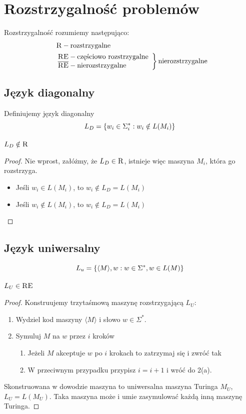 \section{Rozstrzygalność problemów}
Rozstrzygalność rozumiemy następująco:
\begin{align*}
& \ \: \textsc{R} - \text{rozstrzygalne} \\
& \left.
\begin{array}{l}
\textsc{RE} - \text{częściowo rozstrzygalne} \\
\overline{\textsc{RE}} - \text{nierozstrzygalne}
\end{array}
\right\} \text{nierozstrzygalne}
\end{align*}

\subsection{Język diagonalny}
Definiujemy język diagonalny
\[ L_D = \set{w_i \in \Sigma_i^*: w_i \notin L(M_i)} \]
\begin{theorem}
    \( L_D \notin \textsc{R} \)
\end{theorem}
\begin{proof}
    Nie wprost, załóżmy, że \( L_D \in \textsc{R} \), istnieje więc maszyna \(M_i\), która go rozstrzyga.
    \begin{itemize}
        \item Jeśli \( w_i \in L(M_i) \), to \( w_i \notin L_D = L(M_i) \)
        \item Jeśli \( w_i \notin L(M_i) \), to \( w_i \notin L_D = L(M_i) \)
    \end{itemize}
\end{proof}

\subsection{Język uniwersalny}
\[ L_u = \set{\langle M \rangle, w: w \in \Sigma^*, w \in L(M)} \]
\begin{theorem}
    \(L_U \in \textsc{RE}\)
\end{theorem}
\begin{proof}
Konstruujemy trzytaśmową maszynę rozstrzygającą \(L_U\):
\begin{enumerate}
    \item Wydziel kod maszyny \(\langle M \rangle\) i słowo \(w \in \Sigma^*\).
    \item Symuluj \(M\) na \(w\) przez \(i\) kroków
    \begin{enumerate}
        \item Jeżeli \(M\) akceptuje \(w\) po \(i\) krokach to zatrzymaj się i zwróć tak
        \item W przeciwnym przypadku przypisz \( i = i+1 \) i wróć do 2(a).
    \end{enumerate}
\end{enumerate}
Skonstruowana w dowodzie maszyna to uniwersalna maszyna Turinga \(M_U\), \( L_U = L(M_U) \). Taka maszyna może i umie zasymulować każdą inną maszynę Turinga.
\end{proof}

